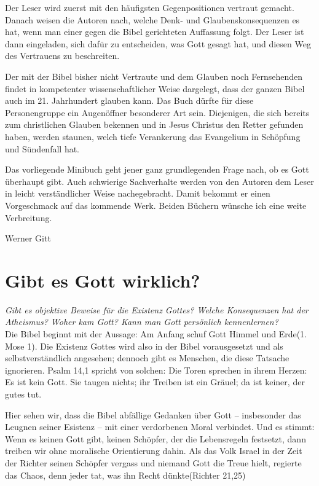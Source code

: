 \documentclass{../inc/mybibbook}
\begin{document}
Der Leser wird zuerst mit den häufigsten Gegenpositionen vertraut gemacht. Danach weisen die Autoren nach, welche Denk- und Glaubenskonsequenzen es hat, wenn man einer gegen die Bibel gerichteten Auffassung folgt. Der Leser ist dann eingeladen, sich dafür zu entscheiden, was Gott gesagt hat, und diesen Weg des Vertrauens zu beschreiten.

Der mit der Bibel bisher nicht Vertraute und dem Glauben noch Fernsehenden findet in kompetenter wissenschaftlicher Weise dargelegt, dass der ganzen Bibel auch im 21. Jahrhundert glauben kann. Das Buch dürfte für diese Personengruppe ein Augenöffner besonderer Art sein. Diejenigen, die sich bereits zum christlichen Glauben bekennen und in Jesus Christus den Retter gefunden haben, werden staunen, welch tiefe Verankerung das Evangelium in Schöpfung und Sündenfall hat.

Das vorliegende Minibuch geht jener ganz grundlegenden Frage nach, ob es Gott überhaupt gibt. Auch schwierige Sachverhalte werden von den Autoren dem Leser in leicht verständlicher Weise nachegebracht. Damit bekommt er einen Vorgeschmack auf das kommende Werk. Beiden Büchern wünsche ich eine weite Verbreitung.

\begin{flushright} Werner Gitt\end{flushright}
\newpage
\section{Gibt es Gott wirklich?}
\textit{Gibt es objektive Beweise für die Existenz Gottes? Welche Konsequenzen hat der Atheismus? Woher kam Gott? Kann man Gott persönlich kennenlernen?}\\
Die Bibel beginnt mit der Aussage: \flqq Am Anfang schuf Gott Himmel und Erde\frqq{}(1. Mose 1). Die Existenz Gottes wird also in der Bibel vorausgesetzt und als selbstverständlich angesehen; dennoch gibt es Menschen, die diese Tatsache ignorieren. Psalm 14,1 spricht von solchen: \flqq Die Toren sprechen in ihrem Herzen: \flq Es ist kein Gott.\frq{} Sie taugen nichts; ihr Treiben ist ein Gräuel; da ist keiner, der gutes tut\frqq.

Hier sehen wir, dass die Bibel abfällige Gedanken über Gott  -- insbesonder das Leugnen seiner Esistenz -- mit einer verdorbenen Moral verbindet. Und es stimmt: Wenn es keinen Gott gibt, keinen Schöpfer, der die Lebensregeln festsetzt, dann treiben wir ohne moralische Orientierung dahin. Als das Volk Israel in der Zeit der Richter seinen Schöpfer vergass und niemand Gott die Treue hielt, regierte das Chaos, denn \flqq jeder tat, was ihn Recht dünkte\frqq{}(Richter 21,25)
\end{document}
